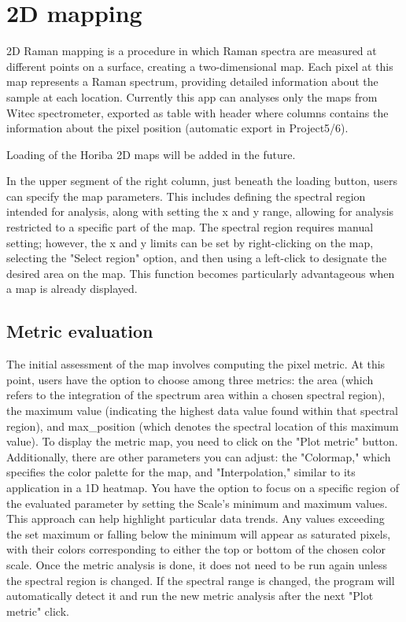 \section{2D mapping}
2D Raman mapping is a procedure in which Raman spectra are measured at different points on a surface, creating a two-dimensional map. Each pixel at this map represents a Raman spectrum, providing detailed information about the sample at each location.
Currently this app can analyses only the maps from Witec spectrometer, exported as table with header where columns contains the information about the pixel position (automatic export in Project5/6).

Loading of the Horiba 2D maps will be added in the future.

In the upper segment of the right column, just beneath the loading button, users can specify the map parameters. This includes defining the spectral region intended for analysis, along with setting the x and y range, allowing for analysis restricted to a specific part of the map. The spectral region requires manual setting; however, the x and y limits can be set by right-clicking on the map, selecting the "Select region" option, and then using a left-click to designate the desired area on the map. This function becomes particularly advantageous when a map is already displayed.

\subsection{Metric evaluation}
The initial assessment of the map involves computing the pixel metric. At this point, users have the option to choose among three metrics: the area (which refers to the integration of the spectrum area within a chosen spectral region), the maximum value (indicating the highest data value found within that spectral region), and max\_position (which denotes the spectral location of this maximum value). To display the metric map, you need to click on the "Plot metric" button. Additionally, there are other parameters you can adjust: the "Colormap," which specifies the color palette for the map, and "Interpolation," similar to its application in a 1D heatmap. You have the option to focus on a specific region of the evaluated parameter by setting the Scale's minimum and maximum values. This approach can help highlight particular data trends. Any values exceeding the set maximum or falling below the minimum will appear as saturated pixels, with their colors corresponding to either the top or bottom of the chosen color scale. Once the metric analysis is done, it does not need to be run again unless the spectral region is changed. If the spectral range is changed, the program will automatically detect it and run the new metric analysis after the next "Plot metric" click.

